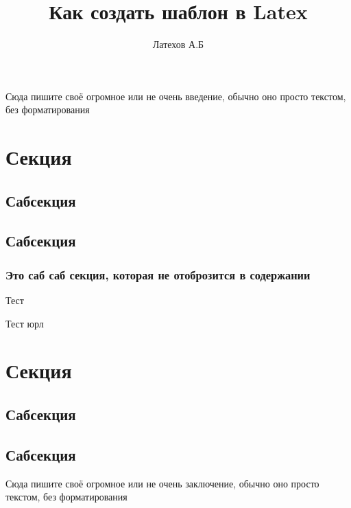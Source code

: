 
\def\institute{Автоматики и информационных технологий}
\def\kafedra{Электроники, телекоммуникации и космических технологий}
\def\tipraboty{СРСП}
\author{Латехов А.Б}
\title{Как создать шаблон в Latex}
\def\prepod{Гончаров А.Б}
\def\shifrop{0A00000}

	
	
	\tableofcontents
	\newpage
	
	Сюда пишите своё огромное или не очень введение, обычно оно просто текстом, без форматирования
	\newpage
	
	\section{Секция}
	\subsection{Сабсекция}
	\subsection{Сабсекция}
	\subsubsection{Это саб саб секция, которая не отоброзится в содержании}
	Тест\cite{PinillaToro2019}
	
	Тест юрл
	\newpage
	
	\section{Секция}
	\subsection{Сабсекция}
	\subsection{Сабсекция}
	\newpage
	
	Сюда пишите своё огромное или не очень заключение, обычно оно просто текстом, без форматирования
	
	\newpage
	\printbibliography

